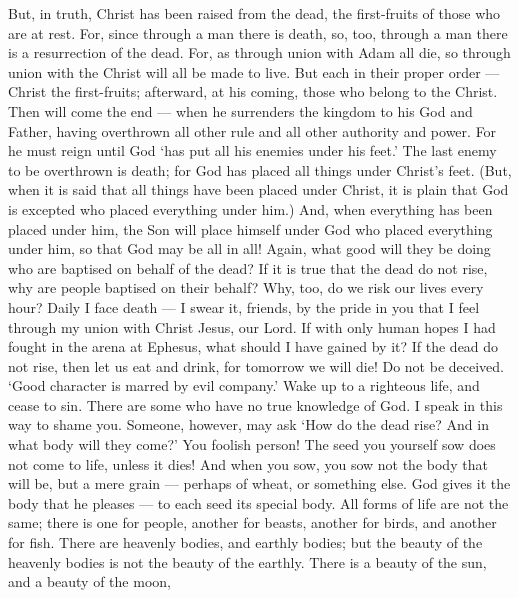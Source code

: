  But, in truth, Christ has been raised from the dead, the
first-fruits of those who are at rest.  For, since through
a man there is death, so, too, through a man there is a resurrection of
the dead.  For, as through union with Adam all die, so
through union with the Christ will all be made to live. 
But each in their proper order --- Christ the first-fruits; afterward,
at his coming, those who belong to the Christ.  Then will
come the end --- when he surrenders the kingdom to his God and Father,
having overthrown all other rule and all other authority and power.
 For he must reign until God `has put all his enemies under
his feet.'  The last enemy to be overthrown is death;
 for God has placed all things under Christ's feet. (But,
when it is said that all things have been placed under Christ, it is
plain that God is excepted who placed everything under him.)
 And, when everything has been placed under him, the Son
will place himself under God who placed everything under him, so that
God may be all in all!  Again, what good will they be doing
who are baptised on behalf of the dead? If it is true that the dead do
not rise, why are people baptised on their behalf?  Why,
too, do we risk our lives every hour?  Daily I face death
--- I swear it, friends, by the pride in you that I feel through my
union with Christ Jesus, our Lord.  If with only human
hopes I had fought in the arena at Ephesus, what should I have gained by
it? If the dead do not rise, then let us eat and drink, for tomorrow we
will die!  Do not be deceived. `Good character is marred by
evil company.'  Wake up to a righteous life, and cease to
sin. There are some who have no true knowledge of God. I speak in this
way to shame you.  Someone, however, may ask `How do the
dead rise? And in what body will they come?'  You foolish
person! The seed you yourself sow does not come to life, unless it dies!
 And when you sow, you sow not the body that will be, but a
mere grain --- perhaps of wheat, or something else.  God
gives it the body that he pleases --- to each seed its special body.
 All forms of life are not the same; there is one for
people, another for beasts, another for birds, and another for fish.
 There are heavenly bodies, and earthly bodies; but the
beauty of the heavenly bodies is not the beauty of the earthly.
 There is a beauty of the sun, and a beauty of the moon,
